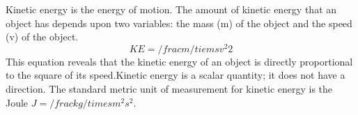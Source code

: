 Kinetic energy is the energy of motion. The amount of kinetic energy that an object has depends upon two variables: the mass (m) of the object and the speed (v) of the object. 
$$KE=/frac{m/tiemsv^2}{2}$$
This equation reveals that the kinetic energy of an object is directly proportional to the square of its speed.Kinetic energy is a scalar quantity; it does not have a direction. The standard metric unit of measurement for kinetic energy is the Joule $J=/frac{kg/timesm^2}{s^2}$. 
